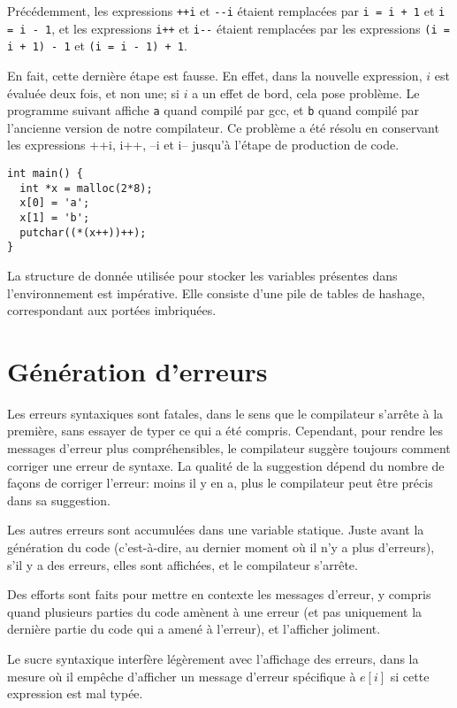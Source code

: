 \documentclass{scrartcl}
\begin{document}
Précédemment, les expressions \verb|++i| et \verb|--i|
étaient remplacées par \verb|i = i + 1| et \verb|i = i - 1|, et les expressions \verb|i++| et \verb|i--| étaient remplacées
par les expressions \verb|(i = i + 1) - 1| et \verb|(i = i - 1) + 1|.\par
En fait, cette dernière étape est fausse. En effet, dans la nouvelle expression,
\(i\) est évaluée deux fois, et non une; si \(i\) a un effet de bord, cela pose
problème. Le programme suivant affiche \verb|a| quand compilé par gcc, et
\verb|b| quand compilé par l'ancienne version de notre compilateur. Ce problème a été résolu
en conservant les expressions ++i, i++, --i et i-- jusqu'à l'étape de production de code. 
\begin{verbatim}
int main() {
  int *x = malloc(2*8);
  x[0] = 'a';
  x[1] = 'b';
  putchar((*(x++))++);
}
\end{verbatim}\par
La structure de donnée utilisée pour stocker les variables présentes dans
l'environnement est impérative. Elle consiste d'une pile de tables de hashage,
correspondant aux portées imbriquées.

\section*{Génération d'erreurs}
Les erreurs syntaxiques sont fatales, dans le sens que le compilateur s'arrête
à la première, sans essayer de typer ce qui a été compris. Cependant, pour rendre
les messages d'erreur plus compréhensibles, le compilateur suggère toujours
comment corriger une erreur de syntaxe. La qualité de la suggestion dépend du
nombre de façons de corriger l'erreur: moins il y en a, plus le compilateur peut
être précis dans sa suggestion.\par
Les autres erreurs sont accumulées dans une variable statique. Juste avant la génération
du code (c'est-à-dire, au dernier moment où il n'y a plus d'erreurs), s'il y a
des erreurs, elles sont affichées, et le compilateur s'arrête.\par
Des efforts sont faits pour mettre en contexte les messages d'erreur, y compris
quand plusieurs parties du code amènent à une erreur (et pas uniquement la
dernière partie du code qui a amené à l'erreur), et l'afficher joliment.\par
Le sucre syntaxique interfère légèrement avec l'affichage des erreurs, dans la
mesure où il empêche d'afficher un message d'erreur spécifique à \(e[i]\) si
cette expression est mal typée.
\end{document}
